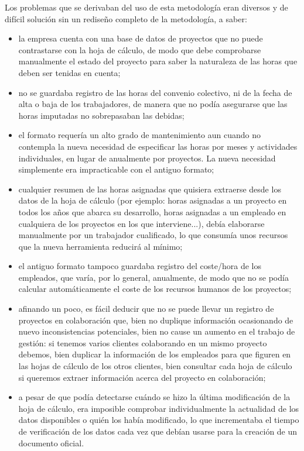 Los problemas que se derivaban del uso de esta metodología eran diversos y de
difícil solución sin un rediseño completo de la metodología, a saber:
\begin{itemize}
\item la empresa cuenta con una base de datos de proyectos que no puede
contrastarse con la hoja de cálculo, de modo que debe comprobarse manualmente
el estado del proyecto para saber la naturaleza de las horas que deben ser
tenidas en cuenta;

\item no se guardaba registro de las horas del convenio colectivo, ni de la
fecha de alta o baja de los trabajadores, de manera que no podía asegurarse que
las horas imputadas no sobrepasaban las debidas;

\item el formato requería un alto grado de mantenimiento aun cuando no
contempla la nueva necesidad de especificar las horas por meses y actividades
individuales, en lugar de anualmente por proyectos. La nueva necesidad
simplemente era impracticable con el antiguo formato;

\item cualquier resumen de las horas asignadas que quisiera extraerse desde los
datos de la hoja de cálculo (por ejemplo: horas asignadas a un proyecto en
todos los años que abarca su desarrollo, horas asignadas a un empleado en
cualquiera de los proyectos en los que interviene...), debía elaborarse
manualmente por un trabajador cualificado, lo que consumía unos recursos que la
nueva herramienta reducirá al mínimo;

\item el antiguo formato tampoco guardaba registro del coste/hora de los
empleados, que varía, por lo general, anualmente, de modo que no se podía
calcular automáticamente el coste de los recursos humanos de los proyectos;

\item afinando un poco, es fácil deducir que no se puede llevar un registro de
proyectos en colaboración que, bien no duplique información ocasionando de nuevo
inconsistencias potenciales, bien no cause un aumento en el trabajo de
gestión: si tenemos varios clientes colaborando en un mismo proyecto debemos,
bien duplicar la información de los empleados para que figuren en las hojas de
cálculo de los otros clientes, bien consultar cada hoja de cálculo si
queremos extraer información acerca del proyecto en colaboración; 

\item a pesar de que podía detectarse cuándo se hizo la última modificación de
la hoja de cálculo, era imposible comprobar individualmente la actualidad de los
datos disponibles o quién los había modificado, lo que incrementaba el tiempo de
verificación de los datos cada vez que debían usarse para la creación de un
documento oficial.
\end{itemize}

